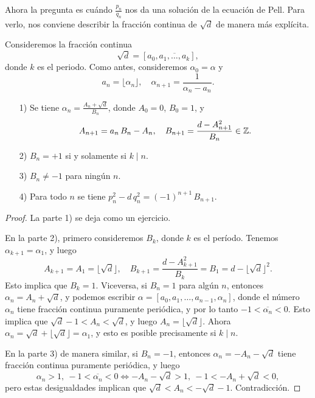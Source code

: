 Ahora la pregunta es cuándo $\frac{p_n}{q_n}$ nos da una solución de la ecuación
de Pell. Para verlo, nos conviene describir la fracción continua de $\sqrt{d}$
de manera más explícita.

\begin{proposicion}
  Consideremos la fracción continua
  $$\sqrt{d} = [a_0, \overline{a_1,\ldots,a_k}],$$
  donde $k$ es el periodo. Como antes, consideremos $\alpha_0 = \alpha$ y
  \[ a_n = \lfloor\alpha_n\rfloor, \quad
     \alpha_{n+1} = \frac{1}{\alpha_n - a_n}. \]

  \begin{enumerate}
  \item[1)] Se tiene $\alpha_n = \frac{A_n + \sqrt{d}}{B_n}$, donde
    $A_0 = 0$, $B_0 = 1$, y
    \begin{equation}
      \label{eq:An-Bn-para-sqrt-d}
      A_{n+1} = a_n\,B_n - A_n, \quad
      B_{n+1} = \frac{d - A_{n+1}^2}{B_n} \in \mathbb{Z}.
    \end{equation}

  \item[2)] $B_n = +1$ si y solamente si $k \mid n$.

  \item[3)] $B_n \ne -1$ para ningún $n$.

  \item[4)] Para todo $n$ se tiene $p_n^2 - d\,q_n^2 = (-1)^{n+1}\,B_{n+1}$.
  \end{enumerate}

  \begin{proof}
    La parte 1) se deja como un ejercicio.

    En la parte 2), primero consideremos $B_k$, donde $k$ es el período.
    Tenemos $\alpha_{k+1} = \alpha_1$, y luego
    \[ A_{k+1} = A_1 = \lfloor\sqrt{d}\rfloor, \quad
       B_{k+1} = \frac{d - A_{k+1}^2}{B_k} = B_1 = d - \lfloor\sqrt{d}\rfloor^2. \]
    Esto implica que $B_k = 1$. Viceversa, si $B_n = 1$ para algún $n$, entonces
    $\alpha_n = A_n + \sqrt{d}$, y podemos escribir
    ${\alpha = [a_0,a_1,\ldots,a_{n-1},\alpha_n]}$, donde el número $\alpha_n$
    tiene fracción continua puramente periódica, y por lo tanto
    ${-1 < \overline{\alpha_n} < 0}$. Esto implica que
    ${\sqrt{d} - 1 < A_n < \sqrt{d}}$, y luego $A_n = \lfloor\sqrt{d}\rfloor$.
    Ahora ${\alpha_n = \sqrt{d} + \lfloor\sqrt{d}\rfloor = \alpha_1}$, y esto es
    posible precisamente si $k \mid n$.

    En la parte 3) de manera similar, si $B_n = -1$, entonces
    ${\alpha_n = -A_n - \sqrt{d}}$ tiene fracción continua puramente periódica,
    y luego
    \[ \alpha_n > 1, ~ -1 < \overline{\alpha_n} < 0
       \iff
       -A_n - \sqrt{d} > 1, ~ -1 < -A_n + \sqrt{d} < 0, \]
    pero estas desigualdades implican que
    ${\sqrt{d} < A_n < -\sqrt{d} - 1}$. Contradicción.


\end{proof}
\end{proposicion}
